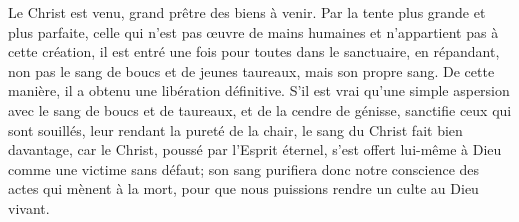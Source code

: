 Le Christ est venu, grand prêtre des biens à venir.
	Par la tente plus grande et plus parfaite,
	celle qui n’est pas œuvre de mains humaines
		et n’appartient pas à cette création,
	il est entré une fois pour toutes dans le sanctuaire,
	en répandant, non pas le sang de boucs et de jeunes taureaux,
	mais son propre sang.
De cette manière, il a obtenu une libération définitive.
S’il est vrai qu’une simple aspersion avec le sang de boucs et de taureaux,
		et de la cendre de génisse,
	sanctifie ceux qui sont souillés, leur rendant la pureté de la chair,
	le sang du Christ fait bien davantage,
	car le Christ, poussé par l’Esprit éternel,
	s’est offert lui-même à Dieu comme une victime sans défaut;
	son sang purifiera donc notre conscience des actes qui mènent à la mort,
	pour que nous puissions rendre un culte au Dieu vivant.
